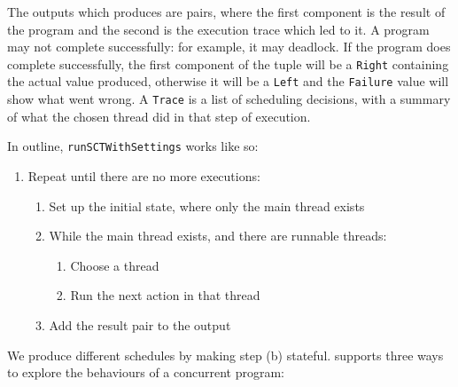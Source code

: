 The outputs which \dejafu{} produces are pairs, where the first
component is the result of the program and the second is the execution
trace which led to it.  A program may not complete successfully: for
example, it may deadlock.  If the program does complete successfully,
the first component of the tuple will be a \verb|Right| containing the
actual value produced, otherwise it will be a \verb|Left| and the
\verb|Failure| value will show what went wrong.  A \verb|Trace| is a
list of scheduling decisions, with a summary of what the chosen thread
did in that step of execution.

In outline, \verb|runSCTWithSettings| works like so:

\begin{enumerate}
\item Repeat until there are no more executions:
  \begin{enumerate}
  \item Set up the initial state, where only the main thread exists
  \item While the main thread exists, and there are runnable threads:
    \begin{enumerate}
    \item Choose a thread
    \item Run the next action in that thread
    \end{enumerate}
  \item Add the result pair to the output
  \end{enumerate}
\end{enumerate}

We produce different schedules by making step (b) stateful.  \dejafu{}
supports three ways to explore the behaviours of a concurrent program:

